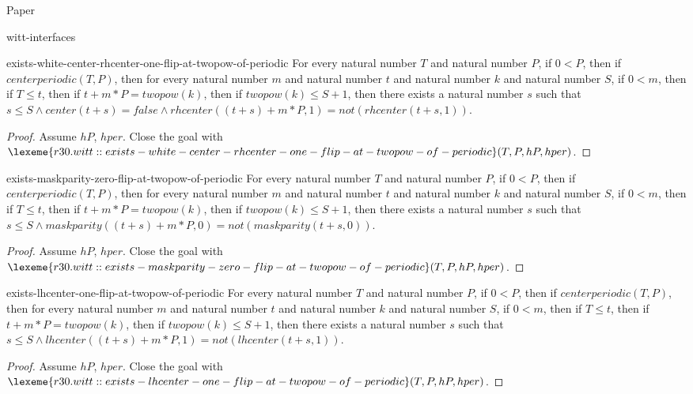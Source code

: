 \begin{lexlean}{Paper}
\begin{section}{witt-interfaces}
  \begin{theorem}{exists-white-center-rhcenter-one-flip-at-twopow-of-periodic}
  For every natural number \(T\) and natural number \(P\), if \(0 < P\), then if \(centerperiodic(T, P)\), then for every natural number \(m\) and natural number \(t\) and natural number \(k\) and natural number \(S\), if \(0 < m\), then if \(T ≤ t\), then if \(t + m * P = twopow(k)\), then if \(twopow(k) ≤ S + 1\), then there exists a natural number \(s\) such that \(s ≤ S ∧ center(t + s) = false ∧ rhcenter((t + s) + m * P, 1) = not(rhcenter(t + s, 1))\).
  \begin{proof}
  Assume \(hP\), \(hper\).
  Close the goal with \(\lexeme{r30.witt::exists-white-center-rhcenter-one-flip-at-twopow-of-periodic}(T, P, hP, hper)\).
  \end{proof}
  \end{theorem}

  \begin{theorem}{exists-maskparity-zero-flip-at-twopow-of-periodic}
  For every natural number \(T\) and natural number \(P\), if \(0 < P\), then if \(centerperiodic(T, P)\), then for every natural number \(m\) and natural number \(t\) and natural number \(k\) and natural number \(S\), if \(0 < m\), then if \(T ≤ t\), then if \(t + m * P = twopow(k)\), then if \(twopow(k) ≤ S + 1\), then there exists a natural number \(s\) such that \(s ≤ S ∧ maskparity((t + s) + m * P, 0) = not(maskparity(t + s, 0))\).
  \begin{proof}
  Assume \(hP\), \(hper\).
  Close the goal with \(\lexeme{r30.witt::exists-maskparity-zero-flip-at-twopow-of-periodic}(T, P, hP, hper)\).
  \end{proof}
  \end{theorem}

  \begin{theorem}{exists-lhcenter-one-flip-at-twopow-of-periodic}
  For every natural number \(T\) and natural number \(P\), if \(0 < P\), then if \(centerperiodic(T, P)\), then for every natural number \(m\) and natural number \(t\) and natural number \(k\) and natural number \(S\), if \(0 < m\), then if \(T ≤ t\), then if \(t + m * P = twopow(k)\), then if \(twopow(k) ≤ S + 1\), then there exists a natural number \(s\) such that \(s ≤ S ∧ lhcenter((t + s) + m * P, 1) = not(lhcenter(t + s, 1))\).
  \begin{proof}
  Assume \(hP\), \(hper\).
  Close the goal with \(\lexeme{r30.witt::exists-lhcenter-one-flip-at-twopow-of-periodic}(T, P, hP, hper)\).
  \end{proof}
  \end{theorem}


\end{section}
\end{lexlean}
